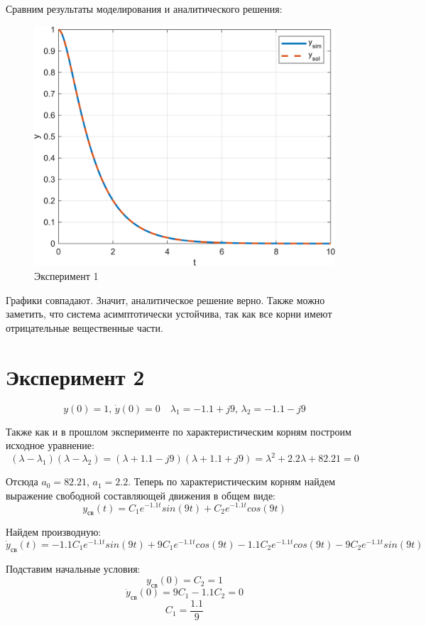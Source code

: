 Сравним результаты моделирования и аналитического решения:
\begin{figure}[H]
    \centering
    \includegraphics[width=1\textwidth, trim={0cm 0cm 0cm 0cm}]{../images/1_1.png}
    \caption{Эксперимент 1}
    \label{fig:exp1}
\end{figure}

Графики совпадают. Значит, аналитическое решение верно. Также можно заметить, что система асимптотически устойчива, так как все корни имеют отрицательные вещественные части.
\section{Эксперимент 2}
\[y(0) = 1,\, \dot y(0) = 0 \quad \lambda_1 = -1.1 + j9,\, \lambda_2 = -1.1 - j9\]

Также как и в прошлом эксперименте по характеристическим корням построим исходное уравнение:
\[(\lambda - \lambda_1)(\lambda - \lambda_2) = (\lambda + 1.1 - j9)(\lambda + 1.1 + j9) = \lambda^2 + 2.2\lambda + 82.21 = 0\]

Отсюда $a_0 = 82.21$, $a_1 = 2.2$. Теперь по характеристическим корням найдем выражение свободной составляющей движения в общем виде:
\[y_{\text{св}}(t) = C_1 e^{-1.1 t} sin(9t) + C_2 e^{-1.1 t} cos(9t)\]

Найдем производную:
\[\dot y_{\text{св}}(t) = -1.1C_1 e^{-1.1 t} sin(9t) + 9C_1 e^{-1.1 t} cos(9t) - 1.1C_2 e^{-1.1 t} cos(9t) - 9C_2 e^{-1.1 t} sin(9t)\]

Подставим начальные условия:
\[y_{\text{св}}(0) = C_2 = 1\]
\[\dot y_{\text{св}}(0) =  9C_1 - 1.1C_2 = 0\]
\[C_1 = \frac{1.1}{9}\]


